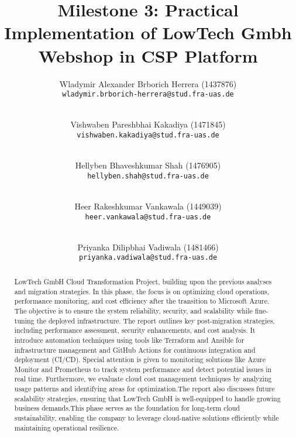 \documentclass{llncs}
\newcommand{\what}{Milestone 3: Practical Implementation of LowTech Gmbh Webshop in CSP Platform}
\begin{document}
%
%
%
\mainmatter              %
%
\title{\what}
%
\author{
    Wladymir Alexander Brborich Herrera (1437876)\\
    \texttt{wladymir.brborich-herrera@stud.fra-uas.de}
    \and\\
    Vishwaben Pareshbhai Kakadiya (1471845)\\
    \texttt{vishwaben.kakadiya@stud.fra-uas.de}
    \and\\
    Hellyben Bhaveshkumar Shah (1476905)\\
    \texttt{hellyben.shah@stud.fra-uas.de}
    \and\\
    Heer Rakeshkumar Vankawala (1449039)
    \\
    \texttt{heer.vankawala@stud.fra-uas.de}
    \and\\
    Priyanka Dilipbhai Vadiwala (1481466)\\
    \texttt{priyanka.vadiwala@stud.fra-uas.de}
}
%

\maketitle              %


\begin{abstract}

    LowTech GmbH Cloud Transformation Project, building upon the previous analyses and migration strategies. In this phase, 
    the focus is on optimizing cloud operations, performance monitoring, and cost efficiency after the transition to Microsoft
    Azure. The objective is to ensure the system reliability, security, and scalability while fine-tuning the deployed infrastructure.
    The report outlines key post-migration strategies, including performance assessment, security enhancements, and cost analysis. 
    It introduce automation techniques using tools like Terraform and Ansible for infrastructure management and GitHub Actions for 
    continuous integration and deployment (CI/CD). Special attention is given to monitoring solutions like Azure Monitor and Prometheus
    to track system performance and detect potential issues in real time. Furthermore, we evaluate cloud cost management techniques by 
    analyzing usage patterns and identifying areas for optimization.The report also discusses future scalability strategies,
    ensuring that LowTech GmbH is well-equipped to handle growing business demands.This phase serves as the foundation for long-term 
    cloud sustainability, enabling the company to leverage cloud-native solutions efficiently while maintaining operational resilience.

\end{abstract}
\end{document}
